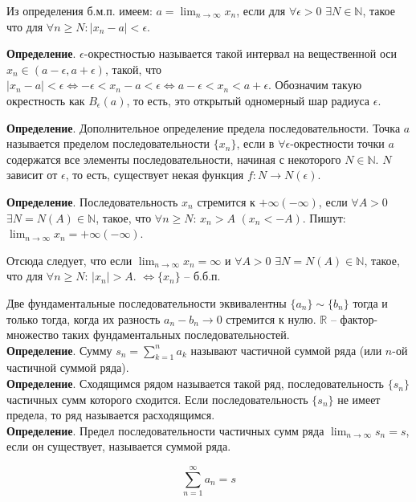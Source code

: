 \documentclass[a4paper]{book}
\begin{document}
Из определения б.м.п. имеем: $a = \lim_{n\rightarrow\infty}x_n$, если для $\forall\epsilon>0$ $\exists N\in\mathbb{N}$, такое что для $\forall n\geq N: | x_n - a | <\epsilon$. 

\textbf{Определение}. $\epsilon$-окрестностью называется такой интервал на вещественной оси $x_n\in (a-\epsilon,a+\epsilon)$, такой, что $| x_n - a | < \epsilon \Leftrightarrow -\epsilon<x_n - a<\epsilon \Leftrightarrow a-\epsilon<x_n<a+\epsilon$. Обозначим такую окрестность как $B_{\epsilon}(a)$, то есть, это открытый одномерный шар радиуса $\epsilon$. 

\textbf{Определение}. Дополнительное определение предела последовательности. Точка $a$  называется пределом последовательности $\{x_n\}$, если в $\forall\epsilon$-окрестности точки $a$ содержатся все элементы последовательности, начиная с некоторого $N\in\mathbb{N}$. $N$ зависит от $\epsilon$, то есть, существует некая функция $f:N\rightarrow N(\epsilon)$.

\textbf{Определение}. Последовательность $x_n$ стремится к $+ \infty(- \infty)$, если $\forall A > 0$ $\exists N = N(A)\in \mathbb{N}$, такое, что $\forall n \geq N$: $x_n > A$ $(x_n <-A)$. Пишут: $\lim_{n\rightarrow\infty}x_n = + \infty (- \infty)$. 

Отсюда следует, что если $\lim_{n\rightarrow\infty}x_n = \infty$ и $\forall A > 0$ $\exists N = N(A)\in\mathbb{N}$, такое, что для $\forall n\geq N$: $| x_n | > A$. $\Leftrightarrow \{x_n\}$ -- б.б.п. 

Две фундаментальные последовательности эквивалентны $\{a_n\}\sim\{b_n\}$ тогда и только тогда, когда их разность $a_n - b_n \rightarrow 0$ стремится к нулю. 
$\mathbb{R}$ -- фактор-множество таких фундаментальных последовательностей.
\\
\textbf{Определение}. Сумму $s_n = \sum^{n}_{k=1}a_k$ называют частичной суммой ряда (или $n$-ой частичной суммой ряда).
\\
\textbf{Определение}. Сходящимся рядом называется такой ряд, последовательность $\{s_n\}$ частичных сумм которого сходится. Если последовательность $\{s_n\}$ не имеет предела, то ряд называется расходящимся. 
\\
\textbf{Определение}. Предел последовательности частичных сумм ряда $\lim_{n\rightarrow\infty}s_n = s$, если он существует, называется суммой ряда. 

\begin{equation}
\sum_{n=1}^{\infty} a_n = s
\end{equation}
\end{document}
